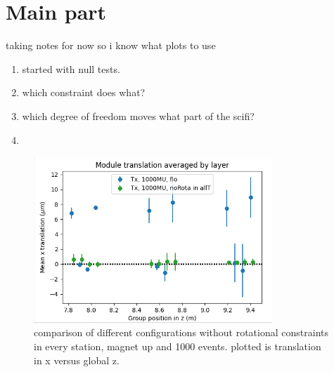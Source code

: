 \chapter{Main part}
\label{sec:story}


taking notes for now so i know what plots to use
\begin{enumerate}
  \item started with null tests.
  \item which constraint does what?
  \item which degree of freedom moves what part of the scifi?
  \item
\end{enumerate}


\begin{figure}
  \centering
  \includegraphics[width=0.8\textwidth]{plots/june_21/Tx_noRota_allT_1000MU.png}
  \caption{comparison of different configurations without rotational constraints in every station, magnet up and 1000 events. plotted is translation in x versus global z.}
  \label{fig:june_2}
\end{figure}


